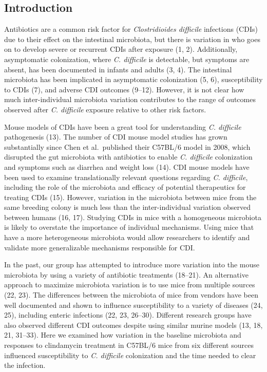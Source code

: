 \documentclass[
  11pt,
]{article}
\begin{document}
\newpage

\hypertarget{introduction}{%
\subsection{Introduction}\label{introduction}}

Antibiotics are a common risk factor for \emph{Clostridioides difficile}
infections (CDIs) due to their effect on the intestinal microbiota, but
there is variation in who goes on to develop severe or recurrent CDIs
after exposure (1, 2). Additionally, asymptomatic colonization, where
\emph{C. difficile} is detectable, but symptoms are absent, has been
documented in infants and adults (3, 4). The intestinal microbiota has
been implicated in asymptomatic colonization (5, 6), susceptibility to
CDIs (7), and adverse CDI outcomes (9--12). However, it is not clear how
much inter-individual microbiota variation contributes to the range of
outcomes observed after \emph{C. difficile} exposure relative to other
risk factors.

Mouse models of CDIs have been a great tool for understanding \emph{C.
difficile} pathogenesis (13). The number of CDI mouse model studies has
grown substantially since Chen et al.~published their C57BL/6 model in
2008, which disrupted the gut microbiota with antibiotics to enable
\emph{C. difficile} colonization and symptoms such as diarrhea and
weight loss (14). CDI mouse models have been used to examine
translationally relevant questions regarding \emph{C. difficile},
including the role of the microbiota and efficacy of potential
therapeutics for treating CDIs (15). However, variation in the
microbiota between mice from the same breeding colony is much less than
the inter-individual variation observed between humans (16, 17).
Studying CDIs in mice with a homogeneous microbiota is likely to
overstate the importance of individual mechanisms. Using mice that have
a more heterogeneous microbiota would allow researchers to identify and
validate more generalizable mechanisms responsible for CDI.

In the past, our group has attempted to introduce more variation into
the mouse microbiota by using a variety of antibiotic treatments
(18--21). An alternative approach to maximize microbiota variation is to
use mice from multiple sources (22, 23). The differences between the
microbiota of mice from vendors have been well documented and shown to
influence susceptibility to a variety of diseases (24, 25), including
enteric infections (22, 23, 26--30). Different research groups have also
observed different CDI outcomes despite using similar murine models (13,
18, 21, 31--33). Here we examined how variation in the baseline
microbiota and responses to clindamycin treatment in C57BL/6 mice from
six different sources influenced susceptibility to \emph{C. difficile}
colonization and the time needed to clear the infection.
\end{document}

